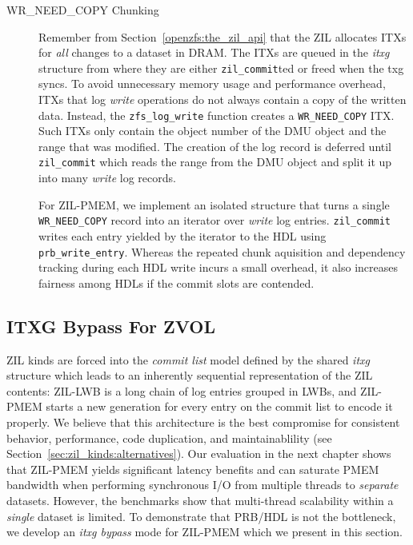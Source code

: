 \documentclass[12pt,a4paper,twoside]{book}
\begin{document}
\begin{description}
    \item[WR\_NEED\_COPY Chunking]
        Remember from Section~\ref{openzfs:the_zil_api} that the ZIL allocates ITXs for \textit{all} changes to a dataset in DRAM.
        The ITXs are queued in the \textit{itxg} structure from where they are either \lstinline{zil_commit}ted or freed when the txg syncs.
        To avoid unnecessary memory usage and performance overhead, ITXs that log \textit{write} operations do not always contain a copy of the written data.
        Instead, the \lstinline{zfs_log_write} function creates a \lstinline{WR_NEED_COPY} ITX.
        Such ITXs only contain the object number of the DMU object and the range that was modified.
        The creation of the log record is deferred until \lstinline{zil_commit} which reads the range from the DMU object and split it up into many \textit{write} log records.

        For ZIL-PMEM, we implement an isolated structure that turns a single \lstinline{WR_NEED_COPY} record into an iterator over \textit{write} log entries.
        \lstinline{zil_commit} writes each entry yielded by the iterator to the HDL using \lstinline{prb_write_entry}.
        Whereas the repeated chunk aquisition and dependency tracking during each HDL write incurs a small overhead, it also increases fairness among HDLs if the commit slots are contended.

\end{description}

\subsection{ITXG Bypass For ZVOL}\label{sec:itxgbypass}
ZIL kinds are forced into the \textit{commit list} model defined by the shared \textit{itxg} structure which leads to an inherently sequential representation of the ZIL contents:
ZIL-LWB is a long chain of log entries grouped in LWBs, and ZIL-PMEM starts a new generation for every entry on the commit list to encode it properly.
We believe that this architecture is the best compromise for consistent behavior, performance, code duplication, and maintainablility (see Section~\ref{sec:zil_kinds:alternatives}).
Our evaluation in the next chapter shows that ZIL-PMEM yields significant latency benefits and can saturate PMEM bandwidth when performing synchronous I/O from multiple threads to \textit{separate} datasets.
However, the benchmarks show that multi-thread scalability within a \textit{single} dataset is limited.
To demonstrate that PRB/HDL is not the bottleneck, we develop an \textit{itxg bypass} mode for ZIL-PMEM which we present in this section.
\end{document}
